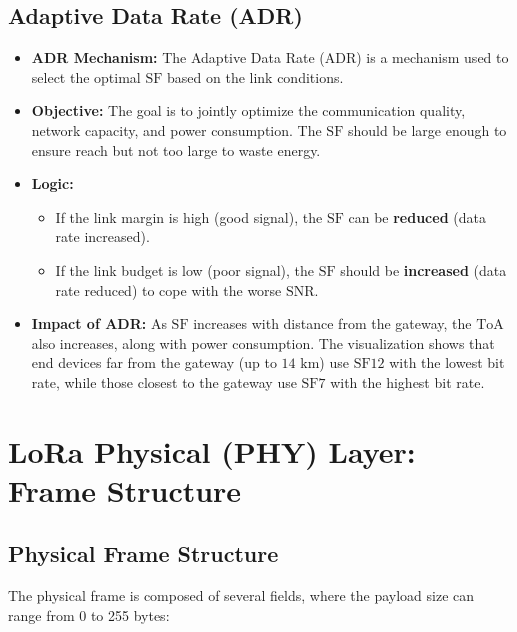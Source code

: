 \documentclass[a4paper, 12pt]{book} %
\begin{document}
\section{Adaptive Data Rate (ADR)}\label{adaptive-data-rate-adr}

\begin{itemize}
\tightlist
\item
  \textbf{ADR Mechanism:} The Adaptive Data Rate (ADR) is a mechanism
  used to select the optimal \(\text{SF}\) based on the link conditions.
\item
  \textbf{Objective:} The goal is to jointly optimize the communication
  quality, network capacity, and power consumption. The \(\text{SF}\)
  should be large enough to ensure reach but not too large to waste
  energy.
\item
  \textbf{Logic:}

  \begin{itemize}
  \tightlist
  \item
    If the link margin is high (good signal), the \(\text{SF}\) can be
    \textbf{reduced} (data rate increased).
  \item
    If the link budget is low (poor signal), the \(\text{SF}\) should be
    \textbf{increased} (data rate reduced) to cope with the worse
    \(\text{SNR}\).
  \end{itemize}
\item
  \textbf{Impact of ADR:} As \(\text{SF}\) increases with distance from
  the gateway, the \(\text{ToA}\) also increases, along with power
  consumption. The visualization shows that end devices far from the
  gateway (up to \(14 \text{ km}\)) use \(\text{SF}12\) with the lowest
  bit rate, while those closest to the gateway use \(\text{SF}7\) with
  the highest bit rate.
\end{itemize}

\chapter{LoRa Physical (PHY) Layer: Frame
Structure}\label{lora-physical-phy-layer-frame-structure}

\section{Physical Frame Structure}\label{physical-frame-structure}

The physical frame is composed of several fields, where the payload size
can range from 0 to 255 bytes:
\end{document}
